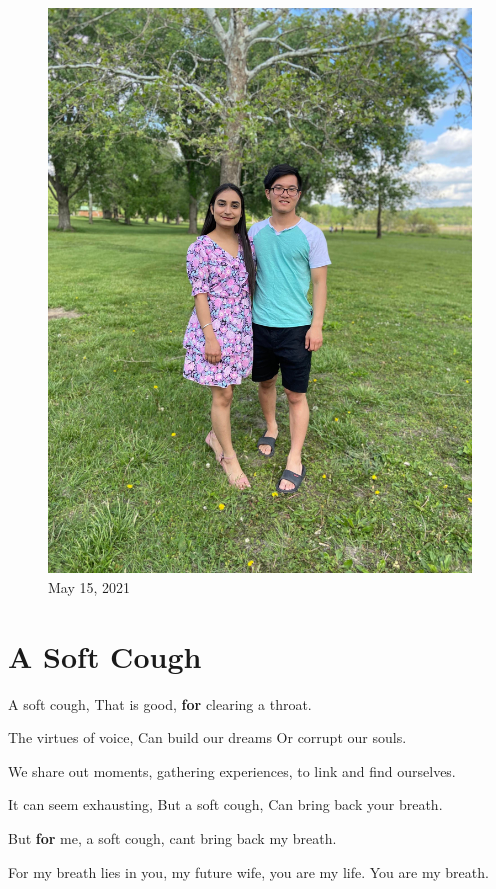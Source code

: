 \documentclass[
]{book}
\newenvironment{Shaded}{\begin{snugshade}}{\end{snugshade}}
\newcommand{\ControlFlowTok}[1]{\textcolor[rgb]{0.13,0.29,0.53}{\textbf{#1}}}
\newcommand{\NormalTok}[1]{#1}
\newcommand{\StringTok}[1]{\textcolor[rgb]{0.31,0.60,0.02}{#1}}
\begin{document}
\begin{figure}
\centering
\includegraphics[width=5.20833in,height=\textheight]{mimages/9 5-15-2021.jpg}
\caption{May 15, 2021}
\end{figure}

\hypertarget{a-soft-cough}{%
\chapter{A Soft Cough}\label{a-soft-cough}}

\begin{Shaded}
\begin{Highlighting}[]
\NormalTok{A soft cough,}
\NormalTok{That is good,}
\ControlFlowTok{for}\NormalTok{ clearing a throat.}

\NormalTok{The virtues of voice,}
\NormalTok{Can build our dreams}
\NormalTok{Or corrupt our souls.  }

\NormalTok{We share out moments,}
\NormalTok{gathering experiences,}
\NormalTok{to link and find ourselves. }

\NormalTok{It can seem exhausting,}
\NormalTok{But a soft cough,}
\NormalTok{Can bring back your breath.}

\NormalTok{But }\ControlFlowTok{for}\NormalTok{ me,}
\NormalTok{a soft cough,}
\NormalTok{can}\StringTok{\textquotesingle{}t bring back my breath.}

\StringTok{For my breath lies in you,}
\StringTok{my future wife, }
\StringTok{you are my life.}
\StringTok{You are my breath.}
\end{Highlighting}
\end{Shaded}
\end{document}
